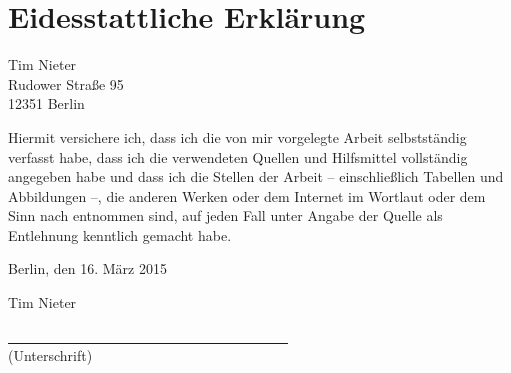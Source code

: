 \chapter*{Eidesstattliche Erklärung}
\label{chapter_erklaerung}
\thispagestyle{empty}

\vfill

Tim Nieter\\
Rudower Straße 95\\
12351 Berlin

\vspace{\baselineskip}

Hiermit versichere ich, dass ich die von mir vorgelegte Arbeit selbstständig verfasst habe, dass ich die verwendeten Quellen und Hilfsmittel
 vollständig angegeben habe und dass ich die Stellen der Arbeit -- einschließlich Tabellen und Abbildungen --, die anderen Werken oder dem Internet im
 Wortlaut oder dem Sinn nach entnommen sind, auf jeden Fall unter Angabe der Quelle als Entlehnung kenntlich gemacht habe.

\vspace{\baselineskip}

Berlin, den {16. März 2015}

\vspace{1cm}

Tim Nieter

\vspace{.5cm}

\underline{~~~~~~~~~~~~~~~~~~~~~~~~~~~~~~~~~~~~~~~~}\\
(Unterschrift)


%